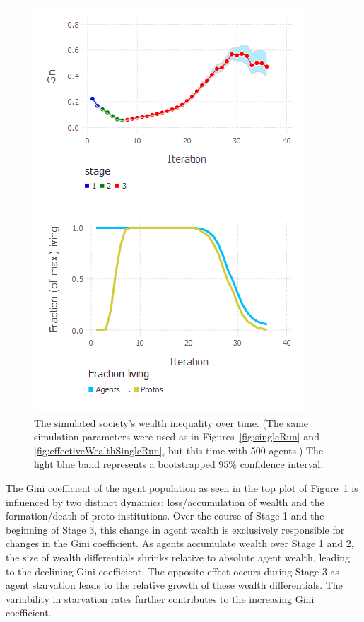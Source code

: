 
\begin{figure}[hb]
\centering
\includegraphics[width=\columnwidth]{figures/giniHistory.png}
\caption{The simulated society's wealth inequality over time. (The same
simulation parameters were used as in Figures~\ref{fig:singleRun} and
\ref{fig:effectiveWealthSingleRun}, but this time with 500 agents.) The light
blue band represents a bootstrapped 95\% confidence interval.}
\label{fig:giniHistory}
\end{figure}

    The Gini coefficient of the agent population as seen in the top plot of Figure~\ref{fig:giniHistory} is influenced by two distinct dynamics: loss/accumulation of wealth and the formation/death of proto-institutions. Over the course of Stage 1 and the beginning of Stage 3, this change in agent wealth is exclusively responsible for changes in the Gini coefficient. As agents accumulate wealth over Stage 1 and 2, the size of wealth differentials shrinks relative to absolute agent wealth, leading to the declining Gini coefficient. The opposite effect occurs during Stage 3 as agent starvation leads to the relative growth of these wealth differentials. The variability in starvation rates further contributes to the increasing Gini coefficient.

